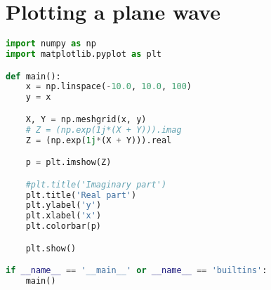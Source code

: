 \section{Plotting a plane wave}\label{lst:plane_wave}
\begin{lstlisting}[language=Python]
import numpy as np
import matplotlib.pyplot as plt

def main():
    x = np.linspace(-10.0, 10.0, 100)
    y = x

    X, Y = np.meshgrid(x, y)
    # Z = (np.exp(1j*(X + Y))).imag
    Z = (np.exp(1j*(X + Y))).real

    p = plt.imshow(Z)

    #plt.title('Imaginary part')
    plt.title('Real part')
    plt.ylabel('y')
    plt.xlabel('x')
    plt.colorbar(p)

    plt.show()

if __name__ == '__main__' or __name__ == 'builtins':
    main()
\end{lstlisting}